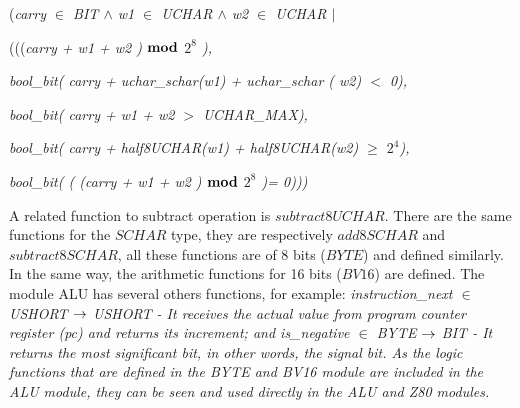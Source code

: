 \documentclass[a4paper]{llncs}
\begin{document}
\hspace*{0.0in}(\it carry $\in$  \it BIT  $\land$  \it w1  $\in$  \it UCHAR  $\land$  \it w2  $\in$  \it UCHAR
$\mid$

\hspace*{0.40in}\rm(\rm(\rm(\it carry \rm + \it w1 \rm + \it w2 \rm )  $\mod$  \it $2^{8}$ \rm ),

\hspace*{0.40in}\it bool\_bit\rm ( \it carry \rm + \it uchar\_schar\rm (\it w1\rm ) \rm + \it uchar\_schar \rm (\it
w2\rm ) $<$ \rm 0\rm ),

\hspace*{0.40in}\it bool\_bit\rm ( \it carry \rm + \it w1 \rm + \it w2 $>$ \it UCHAR\_MAX\rm )\rm ,

\hspace*{0.40in}\it bool\_bit\rm ( \it carry \rm + \it half8UCHAR\rm (\it w1\rm) \rm + \it half8UCHAR\rm (\it w2\rm)  $\geq$  \it $2^{4}$\rm )\rm,

\hspace*{0.40in}\it bool\_bit\rm ( \rm ( \rm (\it carry \rm + \it w1 \rm + \it w2 \rm )  $\mod$  \it $2^{8}$ \rm
)\rm = \rm 0\rm )\rm )\hspace*{0.10in}\rm )

\hspace*{0.20in}

A related function to subtract operation is $\textit{subtract8UCHAR}$. There are the same functions for the
$\textit{SCHAR}$ type, they are respectively $\textit{add8SCHAR}$ and $\textit{subtract8SCHAR}$, all these
functions are of 8 bits ($\textit{BYTE}$) and defined similarly. In the same way, the arithmetic functions for 16
bits ($\textit{BV16}$) are defined.
The module ALU has several others functions, for example:%
\it instruction\_next  $\in$  USHORT  $\fun$  USHORT \rm - It receives the  
  actual value from program counter register (\textit{pc}) and returns its increment;
and \it is\_negative  $\in$  \it BYTE  $\fun$  \it BIT \rm - It returns the most significant bit,
 in other words, the signal bit.
As the logic functions that are defined in the \textit{BYTE} and \textit{BV16}
module are included in the \textit{ALU} module, they can be seen and used
directly in the \textit{ALU} and \textit{Z80} modules.
\end{document}
